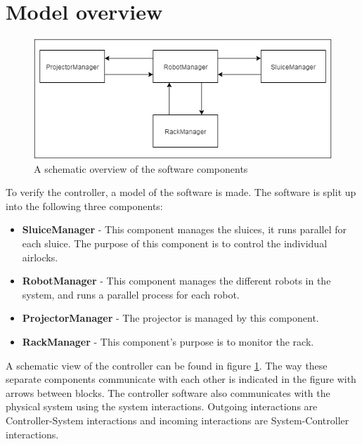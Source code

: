 \documentclass[12pt]{report}
\begin{document}
	\section{Model overview}
	\begin{figure}
		\centering
		\includegraphics[scale=0.7]{schematicoverview}
		\caption{A schematic overview of the software components}
		\label{fig:components}
	\end{figure}
	To verify the controller, a model of the software is made. The software is split up into the following three components:
	\begin{itemize}
	\item \textbf{SluiceManager} - This component manages the sluices, it runs parallel for each sluice. The purpose of this component is to control the individual airlocks.
	\item \textbf{RobotManager} - This component manages the different robots in the system, and runs a parallel process for each robot.
	\item \textbf{ProjectorManager} - The projector is managed by this component.
	\item \textbf{RackManager} - This component's purpose is to monitor the rack.
	\end{itemize}
	
	A schematic view of the controller can be found in figure \ref{fig:components}. The way these separate components communicate with each other is indicated in the figure with arrows between blocks. The controller software also communicates with the physical system using the system interactions. Outgoing interactions are Controller-System interactions and incoming interactions are System-Controller interactions.
	
\end{document}
